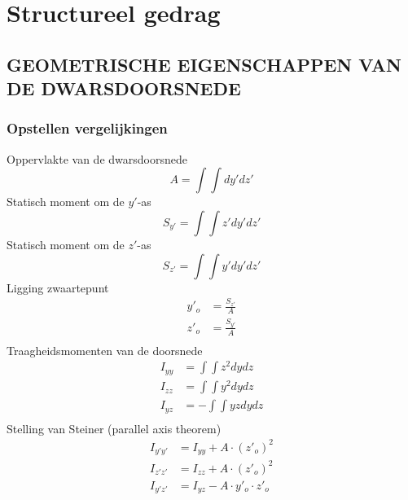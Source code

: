 \chapter{Structureel gedrag}

    \section{GEOMETRISCHE EIGENSCHAPPEN VAN DE DWARSDOORSNEDE}

        \subsection{Opstellen vergelijkingen}

            Oppervlakte van de dwarsdoorsnede
            \begin{equation}
                A=\int\int dy'dz'
            \end{equation}
            Statisch moment om de $y'$-as
            \begin{equation}
                S_{y'} = \int\int z'dy'dz'
            \end{equation}
            Statisch moment om de $z'$-as
            \begin{equation}
                S_{z'} = \int\int y'dy'dz'
            \end{equation}
            Ligging zwaartepunt
            \begin{align}
                y'_o&=\frac{S_{z'}}{A}\nonumber\\
                z'_o&=\frac{S_{y'}}{A}\nonumber\\
            \end{align}
            Traagheidsmomenten van de doorsnede
            \begin{align}
                I_{yy} &= \int\int z^2dydz\nonumber\\
                I_{zz} &= \int\int y^2dydz\nonumber\\
                I_{yz} &= -\int\int yzdydz\nonumber\\
            \end{align}
            Stelling van Steiner (parallel axis theorem)
            \begin{align}
                I_{y'y'} &= I_{yy} + A\cdot(z'_o)^2\nonumber\\
                I_{z'z'} &= I_{zz} + A\cdot(z'_o)^2\nonumber\\
                I_{y'z'} &= I_{yz} - A\cdot y'_o\cdot z'_o\nonumber\\
            \end{align}
